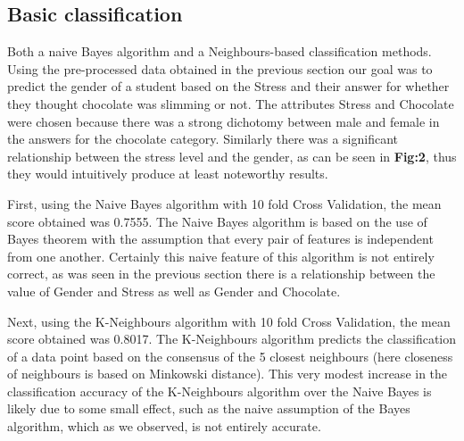 \documentclass{llncs}
\begin{document}
    
\subsection*{Basic classification}

Both a naive Bayes algorithm and a Neighbours-based classification methods. Using the pre-processed data obtained in the previous section our goal was to predict the gender of a student based on the Stress and their answer for whether they thought chocolate was slimming or not. The attributes Stress and Chocolate were chosen because there was a strong dichotomy between male and female in the answers for the chocolate category. Similarly there was a significant relationship between the stress level and the gender, as can be seen in \textbf{Fig:2}, thus they would intuitively produce at least noteworthy results.

First, using the Naive Bayes algorithm with 10 fold Cross Validation, the mean score obtained was 0.7555. The Naive Bayes algorithm is based on the use of Bayes theorem with the assumption that every pair of features is independent from one another. Certainly this naive feature of this algorithm is not entirely correct, as was seen in the previous section there is a relationship between the value of Gender and Stress as well as Gender and Chocolate.

Next, using the K-Neighbours algorithm with 10 fold Cross Validation, the mean score obtained was 0.8017. The K-Neighbours algorithm predicts the classification of a data point based on the consensus of the 5 closest neighbours (here closeness of neighbours is based on Minkowski distance). This very modest increase in the classification accuracy of the K-Neighbours algorithm over the Naive Bayes is likely due to some small effect, such as the naive assumption of the Bayes algorithm, which as we observed, is not entirely accurate.
\end{document}
